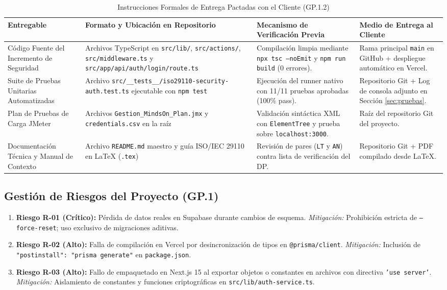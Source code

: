 \documentclass[11pt,a4paper]{article}
\begin{document}
\begin{table}[h!]
\centering
\caption{Instrucciones Formales de Entrega Pactadas con el Cliente (GP.1.2)}
\renewcommand{\arraystretch}{1.2}
\begin{tabular}{@{}p{4.0cm}p{4.3cm}p{4.2cm}p{3.0cm}@{}}
\toprule
\rowcolor{tableHeader}
\textbf{Entregable} & \textbf{Formato y Ubicación en Repositorio} & \textbf{Mecanismo de Verificación Previa} & \textbf{Medio de Entrega al Cliente} \\
\midrule
Código Fuente del Incremento de Seguridad & Archivos TypeScript en \texttt{src/lib/}, \texttt{src/actions/}, \texttt{src/middleware.ts} y \texttt{src/app/api/auth/login/route.ts} & Compilación limpia mediante \texttt{npx tsc --noEmit} y \texttt{npm run build} (0 errores). & Rama principal \texttt{main} en GitHub + despliegue automático en Vercel. \\
Suite de Pruebas Unitarias Automatizadas & Archivo \texttt{src/\_\_tests\_\_/iso29110-security-auth.test.ts} ejecutable con \texttt{npm test} & Ejecución del runner nativo con 11/11 pruebas aprobadas (100\% pass). & Repositorio Git + Log de consola adjunto en Sección \ref{sec:pruebas}. \\
Plan de Pruebas de Carga JMeter & Archivos \texttt{Gestion\_MindsOn\_Plan.jmx} y \texttt{credentials.csv} en la raíz & Validación sintáctica XML con \texttt{ElementTree} y prueba sobre \texttt{localhost:3000}. & Raíz del repositorio Git del proyecto. \\
Documentación Técnica y Manual de Contexto & Archivo \texttt{README.md} maestro y guía ISO/IEC 29110 en LaTeX (\texttt{.tex}) & Revisión de pares (\texttt{LT} y \texttt{AN}) contra lista de verificación del DP. & Repositorio Git + PDF compilado desde LaTeX. \\
\bottomrule
\end{tabular}
\end{table}

\subsection{Gestión de Riesgos del Proyecto (GP.1)}
\begin{enumerate}[noitemsep]
  \item \textbf{Riesgo R-01 (Crítico):} Pérdida de datos reales en Supabase durante cambios de esquema. \textit{Mitigación:} Prohibición estricta de \texttt{--force-reset}; uso exclusivo de migraciones aditivas.
  \item \textbf{Riesgo R-02 (Alto):} Falla de compilación en Vercel por desincronización de tipos en \texttt{@prisma/client}. \textit{Mitigación:} Inclusión de \texttt{"postinstall": "prisma generate"} en \texttt{package.json}.
  \item \textbf{Riesgo R-03 (Alto):} Fallo de empaquetado en Next.js 15 al exportar objetos o constantes en archivos con directiva \texttt{'use server'}. \textit{Mitigación:} Aislamiento de constantes y funciones criptográficas en \texttt{src/lib/auth-service.ts}.
\end{enumerate}
\end{document}
